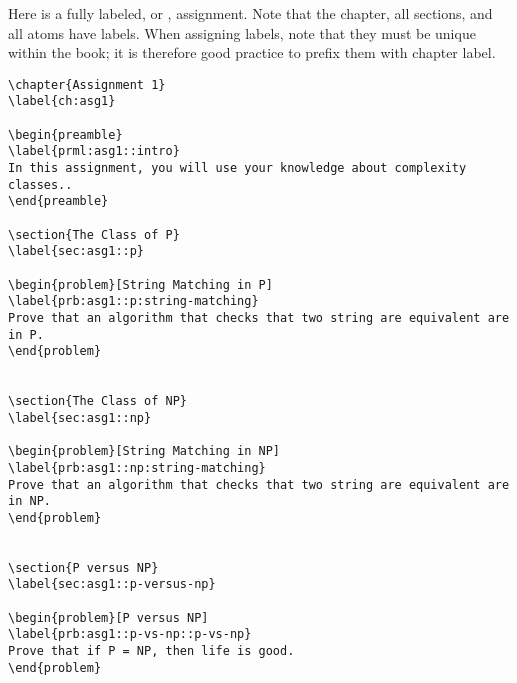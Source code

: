 \begin{example}

Here is a fully labeled, or , assignment.  Note that the chapter, all sections, and all atoms have labels.  When assigning labels, note that they must be unique within the book; it is therefore good practice to prefix them with chapter label.
%

\begin{lstlisting}
\chapter{Assignment 1}
\label{ch:asg1}

\begin{preamble}
\label{prml:asg1::intro}
In this assignment, you will use your knowledge about complexity classes..
\end{preamble}

\section{The Class of P}
\label{sec:asg1::p}

\begin{problem}[String Matching in P]
\label{prb:asg1::p:string-matching}
Prove that an algorithm that checks that two string are equivalent are in P.
\end{problem}


\section{The Class of NP}
\label{sec:asg1::np}

\begin{problem}[String Matching in NP]
\label{prb:asg1::np:string-matching}
Prove that an algorithm that checks that two string are equivalent are in NP.
\end{problem}


\section{P versus NP}
\label{sec:asg1::p-versus-np}

\begin{problem}[P versus NP]
\label{prb:asg1::p-vs-np::p-vs-np}
Prove that if P = NP, then life is good.
\end{problem}

\end{lstlisting}
\end{example}


